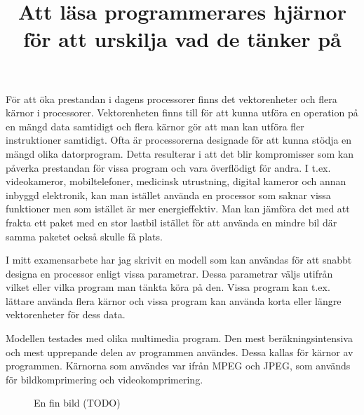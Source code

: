\documentclass{popsci}
\title{Att läsa programmerares hjärnor för att urskilja vad de tänker på}
\begin{document}


{\noindent För att öka prestandan i dagens processorer finns det vektorenheter och flera kärnor i processorer. Vektorenheten finns till för att kunna utföra en operation på en mängd data samtidigt och flera kärnor gör att man kan utföra fler instruktioner samtidigt. Ofta är processorerna designade för att kunna stödja en mängd olika datorprogram. Detta resulterar i att det blir kompromisser som kan påverka prestandan för vissa program och vara överflödigt för andra. I t.ex. videokameror, mobiltelefoner, medicinsk utrustning, digital kameror och annan inbyggd elektronik, kan man istället använda en processor som saknar vissa funktioner men som istället är mer energieffektiv. Man kan jämföra det med att frakta ett paket med en stor lastbil istället för att använda en mindre bil där samma paketet också skulle få plats.

I mitt examensarbete har jag skrivit en modell som kan användas för att snabbt designa en processor enligt vissa parametrar. Dessa parametrar väljs utifrån vilket eller vilka program man tänkta köra på den. Vissa program kan t.ex. lättare använda flera kärnor och vissa program kan använda korta eller längre vektorenheter för dess data.

Modellen testades med olika multimedia program. Den mest beräkningsintensiva och mest upprepande delen av programmen användes. Dessa kallas för kärnor av programmen. Kärnorna som användes var ifrån MPEG och JPEG, som används för bildkomprimering och videokomprimering.

\begin{figure}[!bth] %
\caption{En fin bild (TODO)}
\end{figure}
}
\end{document}
